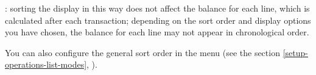 \Note{}: sorting the display in this way does not affect the balance for each line, which is calculated after each transaction; depending on the sort order and display options you have chosen, the balance for each line may not appear in chronological order.

You can also configure the general sort order in the  menu (see the section \vref{setup-operations-list-modes}, ).






